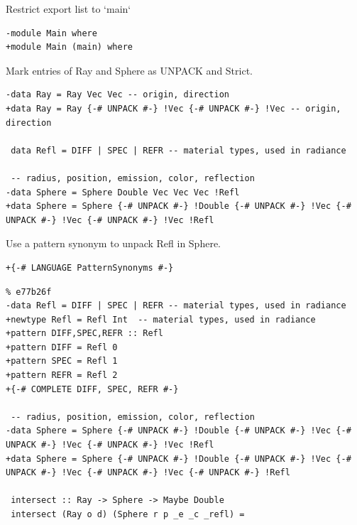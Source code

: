 \documentclass[8pt]{beamer}
\begin{document}
\begin{frame}[fragile]{Restrict export list to `main`}
\begin{verbatim}
-module Main where
+module Main (main) where
\end{verbatim}
\end{frame}

\begin{frame}[fragile]{Mark entries of Ray and Sphere as UNPACK and Strict.}

\begin{verbatim}
-data Ray = Ray Vec Vec -- origin, direction
+data Ray = Ray {-# UNPACK #-} !Vec {-# UNPACK #-} !Vec -- origin, direction

 data Refl = DIFF | SPEC | REFR -- material types, used in radiance

 -- radius, position, emission, color, reflection
-data Sphere = Sphere Double Vec Vec Vec !Refl
+data Sphere = Sphere {-# UNPACK #-} !Double {-# UNPACK #-} !Vec {-# UNPACK #-} !Vec {-# UNPACK #-} !Vec !Refl
\end{verbatim}
\end{frame}


\begin{frame}[fragile]{Use a pattern synonym to unpack Refl in Sphere.}
\begin{verbatim}
+{-# LANGUAGE PatternSynonyms #-}
\end{verbatim}


\begin{verbatim}
% e77b26f
-data Refl = DIFF | SPEC | REFR -- material types, used in radiance
+newtype Refl = Refl Int  -- material types, used in radiance
+pattern DIFF,SPEC,REFR :: Refl
+pattern DIFF = Refl 0
+pattern SPEC = Refl 1
+pattern REFR = Refl 2
+{-# COMPLETE DIFF, SPEC, REFR #-}

 -- radius, position, emission, color, reflection
-data Sphere = Sphere {-# UNPACK #-} !Double {-# UNPACK #-} !Vec {-# UNPACK #-} !Vec {-# UNPACK #-} !Vec !Refl
+data Sphere = Sphere {-# UNPACK #-} !Double {-# UNPACK #-} !Vec {-# UNPACK #-} !Vec {-# UNPACK #-} !Vec {-# UNPACK #-} !Refl

 intersect :: Ray -> Sphere -> Maybe Double
 intersect (Ray o d) (Sphere r p _e _c _refl) =
 \end{verbatim}
\end{frame}
\end{document}

